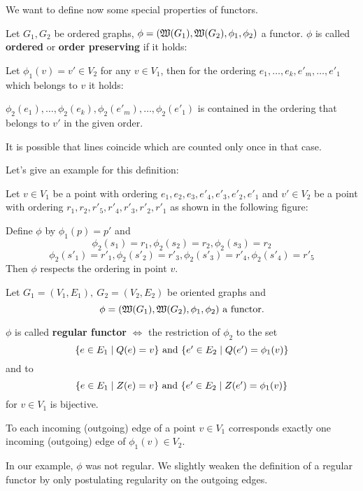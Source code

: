 \bigskip
We want to define now some special properties of functors.

\begin{definition}
Let $G_1, G_2$ be ordered graphs, $\phi = (\mbox{$\mathfrak{W}({G_1})$}, \mbox{$\mathfrak{W}({G_2})$},
\phi_1, \phi_2)$ a functor. $\phi$ is called {\bf ordered} or {\bf order
preserving} if it holds:

Let $\phi_1(v) = v' \in V_2$ for any $v \in V_1$, then for the ordering $e_1,
\ldots, e_k, e'_m, \ldots, e'_1$ which belongs to $v$ it holds:

$\phi_2(e_1), \ldots, \phi_2(e_k), \phi_2(e'_m), \ldots, \phi_2(e'_1)$ is
contained in the ordering that belongs to $v'$ in the given order. 
\end{definition}

It is possible that lines coincide which are counted only once in that case.

Let's give an example for this definition:

Let $v \in V_1$ be a point with ordering $e_1, e_2, e_3, e'_4, e'_3, e'_2,
e'_1$ and $v' \in V_2$ be a point with ordering $r_1, r_2, r'_5,
r'_4, r'_3, r'_2, r'_1$ as shown in the following figure:

\begin{center}

\end{center}

Define $\phi$ by $\phi_1(p) = p'$ and 
\[ \phi_2(s_1) = r_1, \phi_2(s_2) = r_2, \phi_2(s_3) = r_2 \]
\[ \phi_2(s'_1) = r'_1, \phi_2(s'_2) = r'_3, \phi_2(s'_3) = r'_4, \phi_2(s'_4) =
r'_5 \]
Then $\phi$ respects the ordering in point $v$.

\bigskip
\begin{definition}
Let $G_1=(V_1,E_1),\ G_2=(V_2,E_2)$ be oriented graphs and 
\[ \phi = (\mbox{$\mathfrak{W}({G_1})$}, \mbox{$\mathfrak{W}({G_2})$}, \phi_1, \phi_2)\text{ a functor.}
\]

$\phi$ is called {\bf regular functor} $\iff$ the restriction of $\phi_2$
to the set \[ \mbox{$\{e \in E_1 \mid Q(e) = v\}$}\text{ and }\mbox{$\{e' \in E_2 \mid
Q(e') = \phi_1(v)\}$} \] and to \[ \mbox{$\{e \in E_1 \mid Z(e) = v\}$}\text{ and
}\mbox{$\{e' \in E_2 \mid Z(e') = \phi_1(v)\}$} \] for $v \in V_1$ is bijective.
\end{definition}

To each incoming (outgoing) edge of a point $v \in V_1$ corresponds exactly
one incoming (outgoing) edge of $\phi_1(v) \in V_2$.

In our example, $\phi$ was not regular. We slightly weaken the definition of a
regular functor by only postulating regularity on the outgoing edges.

